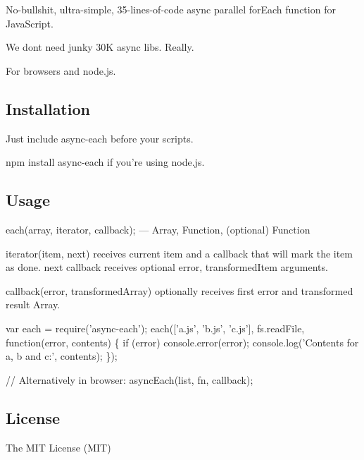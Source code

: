 No-\/bullshit, ultra-\/simple, 35-\/lines-\/of-\/code async parallel for\+Each function for Java\+Script.

We don\textquotesingle{}t need junky 30K async libs. Really.

For browsers and node.\+js.

\subsection*{Installation}


\begin{DoxyItemize}
\item Just include async-\/each before your scripts.
\item {\ttfamily npm install async-\/each} if you’re using node.\+js.
\end{DoxyItemize}

\subsection*{Usage}


\begin{DoxyItemize}
\item {\ttfamily each(array, iterator, callback);} — {\ttfamily Array}, {\ttfamily Function}, {\ttfamily (optional) Function}
\item {\ttfamily iterator(item, next)} receives current item and a callback that will mark the item as done. {\ttfamily next} callback receives optional {\ttfamily error, transformed\+Item} arguments.
\item {\ttfamily callback(error, transformed\+Array)} optionally receives first error and transformed result {\ttfamily Array}.
\end{DoxyItemize}


\begin{DoxyCode}
var each = require('async-each');
each(['a.js', 'b.js', 'c.js'], fs.readFile, function(error, contents) \{
  if (error) console.error(error);
  console.log('Contents for a, b and c:', contents);
\});

// Alternatively in browser:
asyncEach(list, fn, callback);
\end{DoxyCode}


\subsection*{License}

The M\+IT License (M\+IT)

